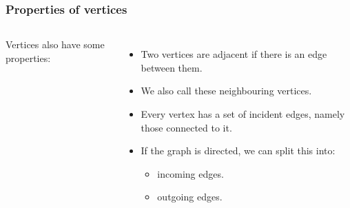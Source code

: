\begin{frame}
	\frametitle{Properties of vertices}
		
	\begin{columns}[T]
			
		Vertices also have some properties:
		
		\begin{itemize}
			\item Two vertices are \alert{adjacent} if there is an edge between them.
			\item We also call these \alert{neighbouring} vertices.
				
			\item Every vertex has a set of \alert{incident} edges, namely those connected to it.
				
			\item If the graph is directed, we can split this into:
				\begin{itemize}
					\item \alert{incoming} edges.
						
					\item \alert{outgoing} edges.
				\end{itemize}
		\end{itemize}
	\end{columns}
\end{frame}

